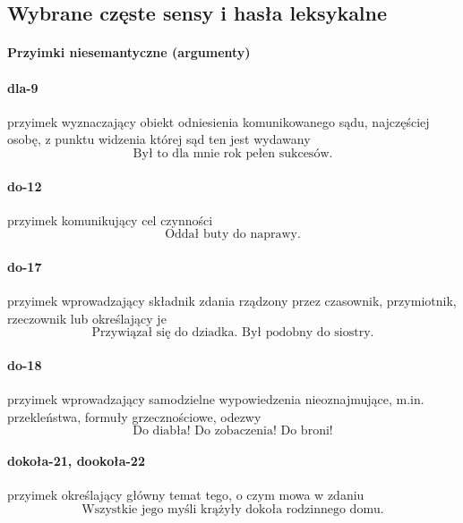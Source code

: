 \documentclass[a4paper, 12pt]{article}
\theoremstyle{remark}
\begin{document}
\subsection{Wybrane częste sensy i hasła leksykalne} %
\label{sec:podzia_ze_wzgldu_na_rol_tematyczna}


\paragraph{Przyimki niesemantyczne (argumenty)} %
\label{sub:argument}
\paragraph{dla-9}\label{prep-9}	przyimek wyznaczający obiekt odniesienia komunikowanego sądu, najczęściej osobę, z punktu widzenia której sąd ten jest wydawany
\begin{equation}
\text{Był to dla mnie rok pełen sukcesów.}
\end{equation}
\paragraph{do-12}\label{prep-12}	przyimek komunikujący cel czynności
\begin{equation}
\text{Oddał buty do naprawy.}
\end{equation}
\paragraph{do-17}\label{prep-17}	przyimek wprowadzający składnik zdania rządzony przez czasownik, przymiotnik, rzeczownik lub określający je
\begin{equation}
\text{Przywiązał się do dziadka. Był podobny do siostry.}
\end{equation}
\paragraph{do-18}\label{prep-18}	przyimek wprowadzający samodzielne wypowiedzenia nieoznajmujące, m.in. przekleństwa, formuły grzecznościowe, odezwy
\begin{equation}
\text{Do diabła! Do zobaczenia! Do broni!}
\end{equation}
\paragraph{dokoła-21, dookoła-22}\label{prep-21}	przyimek określający główny temat tego, o czym mowa w zdaniu
\begin{equation}
\text{Wszystkie jego myśli krążyły dokoła rodzinnego domu.}
\end{equation}
\end{document}
